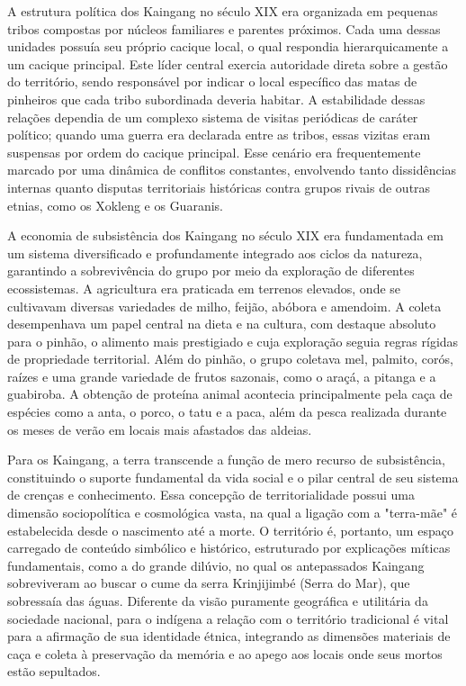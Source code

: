 \documentclass[12pt, a4paper]{article}
\begin{document}
A estrutura política dos Kaingang no século XIX era organizada em pequenas tribos compostas por núcleos familiares e parentes próximos. Cada uma dessas unidades possuía seu próprio cacique local, o qual respondia hierarquicamente a um cacique principal. Este líder central exercia autoridade direta sobre a gestão do território, sendo responsável por indicar o local específico das matas de pinheiros que cada tribo subordinada deveria habitar. A estabilidade dessas relações dependia de um complexo sistema de visitas periódicas de caráter político; quando uma guerra era declarada entre as tribos, essas vizitas eram suspensas por ordem do cacique principal. Esse cenário era frequentemente marcado por uma dinâmica de conflitos constantes, envolvendo tanto dissidências internas quanto disputas territoriais históricas contra grupos rivais de outras etnias, como os Xokleng e os Guaranis.

A economia de subsistência dos Kaingang no século XIX era fundamentada em um sistema diversificado e profundamente integrado aos ciclos da natureza, garantindo a sobrevivência do grupo por meio da exploração de diferentes ecossistemas. A agricultura era praticada em terrenos elevados, onde se cultivavam diversas variedades de milho, feijão, abóbora e amendoim. A coleta desempenhava um papel central na dieta e na cultura, com destaque absoluto para o pinhão, o alimento mais prestigiado e cuja exploração seguia regras rígidas de propriedade territorial. Além do pinhão, o grupo coletava mel, palmito, corós, raízes e uma grande variedade de frutos sazonais, como o araçá, a pitanga e a guabiroba. A obtenção de proteína animal acontecia principalmente pela caça de espécies como a anta, o porco, o tatu e a paca, além da pesca realizada durante os meses de verão em locais mais afastados das aldeias.

Para os Kaingang, a terra transcende a função de mero recurso de subsistência, constituindo o suporte fundamental da vida social e o pilar central de seu sistema de crenças e conhecimento. Essa concepção de territorialidade possui uma dimensão sociopolítica e cosmológica vasta, na qual a ligação com a "terra-mãe" é estabelecida desde o nascimento até a morte. O território é, portanto, um espaço carregado de conteúdo simbólico e histórico, estruturado por explicações míticas fundamentais, como a do grande dilúvio, no qual os antepassados Kaingang sobreviveram ao buscar o cume da serra Krinjijimbé (Serra do Mar), que sobressaía das águas. Diferente da visão puramente geográfica e utilitária da sociedade nacional, para o indígena a relação com o território tradicional é vital para a afirmação de sua identidade étnica, integrando as dimensões materiais de caça e coleta à preservação da memória e ao apego aos locais onde seus mortos estão sepultados.
\end{document}
